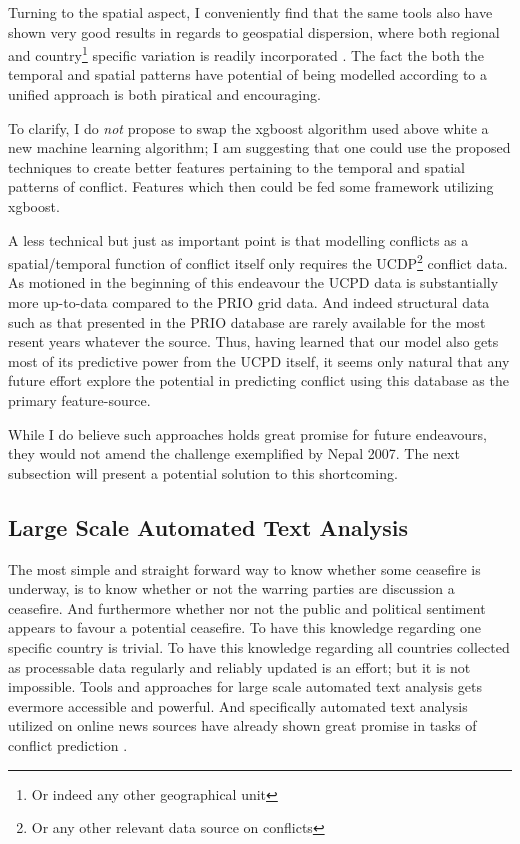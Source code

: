 \documentclass[a4paper]{article}
\begin{document}
Turning to the spatial aspect, I conveniently find that the same tools also have shown very good results in regards to geospatial dispersion, where both regional and country\footnote{Or indeed any other geographical unit} specific variation is readily incorporated \citep{gelfand2003spatial, gelfand2012hierarchical, gelfand2016spatial}. The fact the both the temporal and spatial patterns have potential of being modelled according to a unified approach is both piratical and encouraging.\par

To clarify, I do \emph{not} propose to swap the xgboost algorithm used above white a new machine learning algorithm; I am suggesting that one could use the proposed techniques to create better features pertaining to the temporal and spatial patterns of conflict. Features which then could be fed some framework utilizing xgboost.\par

A less technical but just as important point is that modelling conflicts as a spatial/temporal function of conflict itself only requires the UCDP\footnote{Or any other relevant data source on conflicts} conflict data. As motioned in the beginning of this endeavour the UCPD data is substantially more up-to-data compared to the PRIO grid data. And indeed structural data such as that presented in the PRIO database are rarely available for the most resent years whatever the source. Thus, having learned that our model also gets most of its predictive power from the UCPD itself, it seems only natural that any future effort explore the potential in predicting conflict using this database as the primary feature-source.\par

While I do believe such approaches holds great promise for future endeavours, they would not amend the challenge exemplified by Nepal 2007. The next subsection will present a potential solution to this shortcoming.\par

\subsection{Large Scale Automated Text Analysis}

The most simple and straight forward way to know whether some ceasefire is underway, is to know whether or not the warring parties are discussion a ceasefire. And furthermore whether nor not the public and political sentiment appears to favour a potential ceasefire. To have this knowledge regarding one specific country is trivial. To have this knowledge regarding all countries collected as processable data regularly and reliably updated is an effort; but it is not impossible. Tools and approaches for large scale automated text analysis gets evermore accessible and powerful. And specifically automated text analysis utilized on online news sources have already shown great promise in tasks of conflict prediction \citep{chadefaux_2014, mueller_2016}. 
\end{document}
